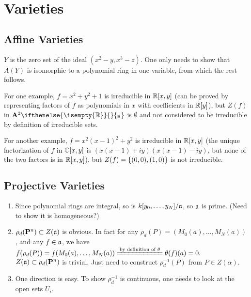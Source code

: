 \documentclass{note}
\newcommand{\Affine}[2][]{\mathbf{A}^{#2}\ifthenelse{\isempty{#1}}{}{_{#1}}}
\newcommand{\Proj}[1]{\mathbf{P}^{#1}}
\begin{document}
\chapter{Varieties}

\section{Affine Varieties}

\setcounter{exercise}{1}
\Ex
$Y$ is the zero set of the ideal $(x^2-y,x^3-z)$. One only needs to
show that $A(Y)$ is isomorphic to a polynomial ring in one variable, from which
the rest follows.

\setcounter{exercise}{11}
\Ex
For one example, $f = x^2 + y^2 + 1$ is irreducible in
$\polynomials{\reals}{x}{y}$ (can be proved by representing factors of $f$ as
polynomials in $x$ with coefficients in $\polynomials{\reals}{y}$), but $Z(f)$
in $\Affine[\reals]{2}$ is $\emptyset$ and not considered to be irreducible by
definition of irreducible sets.

For another example, $f = x^2(x-1)^2 + y^2$ is irreducible in
$\polynomials{\reals}{x}{y}$ (the unique factorization of $f$ in
$\polynomials{\complexes}{x}{y}$ is $(x(x-1) + iy)(x(x-1) - iy)$, but none of
the two factors is in $\polynomials{\reals}{x}{y}$), but $Z(f) = \set{(0,
    0)}{(1, 0)}$ is not irreducible.

\section{Projective Varieties}

\setcounter{exercise}{11}
\Ex
\begin{enumerate}
  \item Since polynomial rings are integral, so is
        $\polynomials{k}{y_0}{\dots}{y_N}/\ideal{a}$, so $\mathfrak{a}$ is prime. (Need to
        show it is homogeneous?)
  \item $\rho_d(\Proj{n})\subset Z(\ideal{a})$ is
        obvious. In fact for any $\rho_d(P)=(M_0(a),\dots,M_N(a))$, and any
        $f\in\mathfrak{a}$, we have $f(\rho_d(P)) = f(M_0(a),\dots,M_N(a))
          \xlongequal{\text{by definition of }\theta} \theta(f)(a) = 0.$\\
        $Z(\ideal{a})\subset\rho_d(\Proj{n})$ is trivial. Just need to construct
        $\rho_d^{-1}(P)$ from $P\in Z(\alpha)$.
  \item One direction is easy. To show $\rho_d^{-1}$ is continuous, one needs to look
        at the open sets $U_i$.
\end{enumerate}
\end{document}
